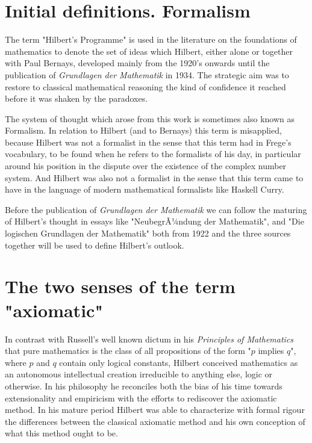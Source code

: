 \documentclass[12pt]{article}
\begin{document}
\tableofcontents

\section{Initial definitions. Formalism}\normalsize                                                 

The term "Hilbert's Programme" is used in the literature on the foundations of mathematics to denote the set of ideas which Hilbert, either alone or together with Paul Bernays, developed mainly from the 1920's onwards until the publication of \emph{Grundlagen der Mathematik} in 1934. The strategic aim was to restore to classical mathematical reasoning the kind of confidence it reached before it was shaken by the paradoxes.

The system of thought which arose from this work is sometimes also known as Formalism. In relation to Hilbert (and to Bernays) this term is misapplied, because Hilbert was not a formalist in the sense that this term had in Frege's vocabulary, to be found when he refers to the formalists of  his day, in particular around his position in the dispute over the existence of the complex number system. And Hilbert was also not a formalist in the sense that this term came to have in the language of modern mathematical formalists like Haskell Curry.

Before the publication of \emph{Grundlagen der Mathematik} we can follow the maturing of Hilbert's thought in essays like "NeubegrÃ¼ndung der Mathematik", and "Die logischen Grundlagen der Mathematik" both from 1922 and the three sources together will be used to define Hilbert's outlook.

\section{The two senses of the term "axiomatic"}\normalsize   

In contrast with Russell's well known dictum in his \emph{Principles of Mathematics} that pure mathematics is the class of all propositions of the form "$p$ implies $q$", where $p$ and $q$ contain only logical constants, Hilbert conceived mathematics as an autonomous intellectual creation irreducible to anything else, logic or otherwise. In his philosophy he reconciles both the bias of his time towards extensionality and empiricism with the efforts to rediscover the axiomatic method. In his mature period Hilbert was able to characterize with formal rigour the differences between the classical axiomatic method and his own conception of what this method ought to be. 
\end{document}
